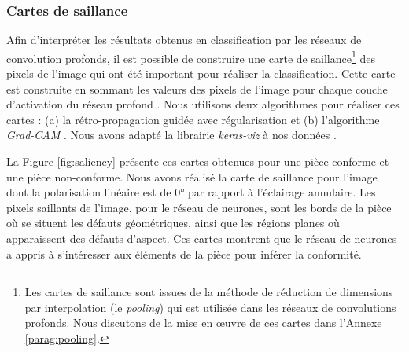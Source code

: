 \subsubsection{Cartes de saillance}
Afin d’interpréter les résultats obtenus en classification par les réseaux de convolution profonds, il est possible de construire une carte de saillance\footnote{Les cartes de saillance sont issues de la méthode de réduction de dimensions par interpolation (le \textit{pooling}) qui est utilisée dans les réseaux de convolutions profonds. Nous discutons de la mise en œuvre de ces cartes dans l'Annexe \ref{parag:pooling}.} des pixels de l'image qui ont été important pour réaliser la classification.
Cette carte est construite en sommant les valeurs des pixels de l’image pour chaque couche d’activation du réseau profond \cite{simonyan_deep_2013, li_visual_2015}.
Nous utilisons deux algorithmes pour réaliser ces cartes : (a) la rétro-propagation guidée \cite{springenberg_striving_2014} avec régularisation \cite{smilkov_smoothgrad_2017} et (b) l’algorithme \textit{Grad-CAM} \cite{selvaraju_grad-cam_2016}.
Nous avons adapté la librairie \textit{keras-viz} à nos données \cite{raghakotkerasvis}.

La Figure \ref{fig:saliency} présente ces cartes obtenues pour une pièce conforme et une pièce non-conforme.
Nous avons réalisé la carte de saillance pour l'image dont la polarisation linéaire est de 0° par rapport à l'éclairage annulaire.
Les pixels saillants de l’image, pour le réseau de neurones, sont les bords de la pièce où se situent les défauts géométriques, ainsi que les régions planes où apparaissent des défauts d’aspect.
Ces cartes montrent que le réseau de neurones a appris à s'intéresser aux éléments de la pièce pour inférer la conformité.

